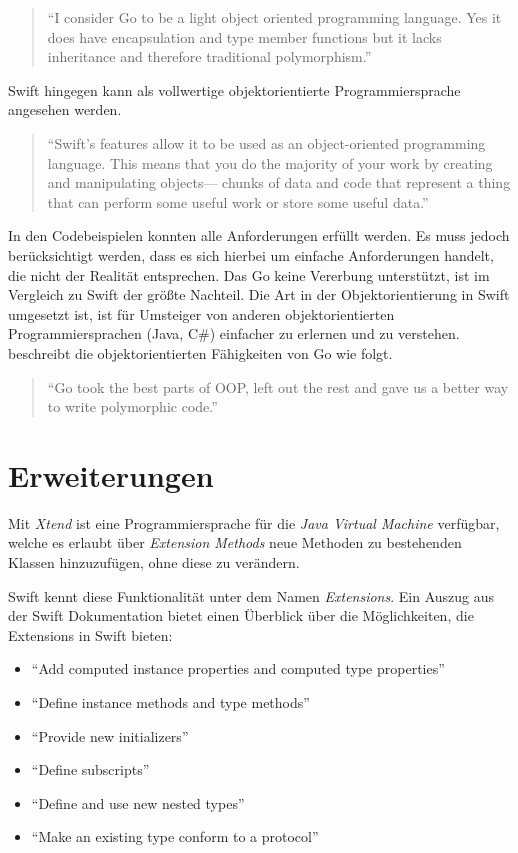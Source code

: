 \begin{quote}
\enquote{I consider Go to be a light object oriented programming language. Yes it does have encapsulation and type member functions but it lacks inheritance and therefore traditional polymorphism.} \cite[]{WilliamKennedy.2013}
\end{quote}

Swift hingegen kann als vollwertige objektorientierte Programmiersprache angesehen werden.

\begin{quote}
\enquote{Swift’s features allow it to be used as an object-oriented programming language. This
means that you do the majority of your work by creating and manipulating objects—
chunks of data and code that represent a thing that can perform some useful work or
store some useful data.} \cite[59]{Manning.2016}
\end{quote}

In den Codebeispielen konnten alle Anforderungen erfüllt werden.
Es muss jedoch berücksichtigt werden, dass es sich hierbei um einfache Anforderungen handelt, die nicht der Realität entsprechen. 
Das Go keine Vererbung unterstützt, ist im Vergleich zu Swift der größte Nachteil.
Die Art in der Objektorientierung in Swift umgesetzt ist, ist für Umsteiger von anderen objektorientierten Programmiersprachen (Java, C\#) einfacher zu erlernen und zu verstehen.
\cite[]{WilliamKennedy.2013} beschreibt die objektorientierten Fähigkeiten von Go wie folgt.

\begin{quote}
\enquote{Go took the best parts of OOP, left out the rest and gave us a better way to write polymorphic code.} \cite[]{WilliamKennedy.2013}
\end{quote}

\section{Erweiterungen}
Mit \textit{Xtend}\cite[]{Xtend} ist eine Programmiersprache für die \textit{Java Virtual Machine} verfügbar, welche es erlaubt über \textit{Extension Methods} neue Methoden zu bestehenden Klassen hinzuzufügen, ohne diese zu verändern.

Swift kennt diese Funktionalität unter dem Namen \textit{Extensions}.
Ein Auszug aus der Swift Dokumentation \cite[S331]{Apple.2017} bietet einen Überblick über die Möglichkeiten, die Extensions in Swift bieten:

\begin{itemize}
    \item \enquote{Add computed instance properties and computed type properties}    
    \item \enquote{Define instance methods and type methods}
    \item \enquote{Provide new initializers}
    \item \enquote{Define subscripts}
    \item \enquote{Define and use new nested types}
    \item \enquote{Make an existing type conform to a protocol}
\end{itemize}

